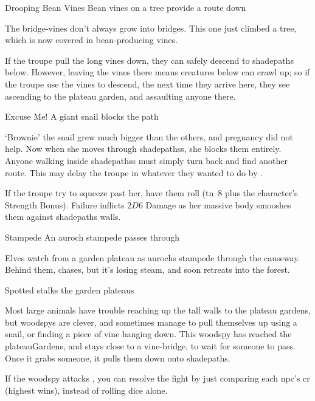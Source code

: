 {Drooping Bean Vines}%
{Bean vines on a tree provide a route down}%

The bridge-vines don't always grow into bridges.
This one just climbed a tree, which is now covered in bean-producing vines.

If the troupe pull the long vines down, they can safely descend to \gls{shadepaths} below.
However, leaving the vines there means creatures below can crawl up; so if the troupe use the vines to descend, the next time they arrive here, they see  ascending to the plateau garden, and assaulting anyone there.


{Excuse Me!}%
{A giant snail blocks the path}%

`Brownie' the snail grew much bigger than the others, and pregnancy did not help.
Now when she moves through \glspl{shadepaths}, she blocks them entirely.
Anyone walking inside \glspl{shadepaths} must simply turn back and find another route.
This may delay the troupe in whatever they wanted to do by .

If the troupe try to squeeze past her, have them roll  (\gls{tn}~8 plus the character's Strength Bonus).
Failure inflicts $2D6$ Damage as her massive body smooshes them against \gls{shadepaths} walls.

{Stampede}%
{An auroch stampede passes through}%

Elves watch from a garden plateau as aurochs stampede through the causeway.
Behind them,  chases, but it's losing steam, and soon retreats into the forest.

{ Spotted}%
{ stalks the garden plateaus}%

Most large animals have trouble reaching up the tall walls to the plateau gardens, but \glspl{woodspy} are clever, and sometimes manage to pull themselves up using a snail, or finding a piece of vine hanging down.
This \gls{woodspy} has reached the \gls{plateauGardens}, and stays close to a vine-bridge, to wait for someone to pass.
Once it grabs someone, it pulls them down onto \gls{shadepaths}.

If the \gls{woodspy} attacks , you can resolve the fight by just comparing each \gls{npc}'s \gls{cr} (highest wins), instead of rolling dice alone.

